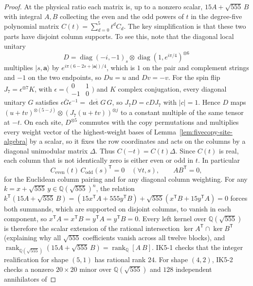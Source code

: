 \begin{proof}
At the physical ratio each matrix is, up to a nonzero scalar,
$15A+\sqrt{555}\,B$ with integral $A,B$ collecting the even and the odd
powers of $t$ in the degree-five polynomial matrix $C(t)=\sum_{d=0}^5 t^d C_d$.
The key simplification is that these two parts have disjoint column supports. To see this, note that the diagonal local unitary
\[
 D=\operatorname{diag}(-i,-1)_s\otimes\operatorname{diag}(1,e^{i\pi/4})^{\otimes6}
\]
multiplies $|s,\mathbf a\rangle$ by $e^{i\pi(6-2s+|\mathbf a|)/4}$, which is $1$ on the
pair and complement strings and $-1$ on the two endpoints, so $Du=u$ and $Dv=-v$.
For the spin flip $J_7=\epsilon^{\otimes7}K$, with
$\epsilon=\bigl(\begin{smallmatrix}0&1\\-1&0\end{smallmatrix}\bigr)$ and $K$ complex
conjugation, every diagonal unitary $G$ satisfies $\epsilon\bar G\epsilon^{-1}=\overline{\det G}\,G$,
so $J_7D=cDJ_7$ with $|c|=1$. Hence $D$ maps
$(u+tv)^{\otimes(5-j)}\otimes(J_7(u+tv))^{\otimes j}$ to a constant multiple of the
same tensor at $-t$. On each site, $D^{\otimes5}$ commutes with the copy permutations
and multiplies every weight vector of the highest-weight bases of
Lemma~\ref{lem:fivecopy-site-algebra} by a scalar, so it fixes the row coordinates
and acts on the columns by a diagonal unimodular matrix $\Delta$. Thus
$C(-t)=C(t)\Delta$. Since $C(t)$ is real, each column that is not identically zero is
either even or odd in $t$. In particular
\[
 C_{\mathrm{even}}(t)\,C_{\mathrm{odd}}(s)^{\mathsf T}=0\quad(\forall t,s),
 \qquad A B^{\mathsf T}=0,
\]
for the Euclidean column pairing and for any diagonal column weighting.
For any $k=x+\sqrt{555}\,y\in\mathbb Q(\sqrt{555})^n$, the relation
$k^{\mathsf T}(15A+\sqrt{555}\,B)=(15x^{\mathsf T}A+555y^{\mathsf T}B)+\sqrt{555}(x^{\mathsf T}B+15y^{\mathsf T}A)=0$
forces both summands, which are supported on disjoint columns, to vanish in each component, so
$x^{\mathsf T}A=x^{\mathsf T}B=y^{\mathsf T}A=y^{\mathsf T}B=0$.
Every left kernel over $\mathbb Q(\sqrt{555})$ is therefore the scalar extension of the rational
intersection $\ker A^{\mathsf T}\cap\ker B^{\mathsf T}$ (explaining why all
$\sqrt{555}$ coefficients vanish across all twelve blocks), and
$\operatorname{rank}_{\mathbb Q(\sqrt{555})}(15A+\sqrt{555}\,B)=\operatorname{rank}_{\mathbb Q}[A\ B]$.
IK5-1 checks that the integer
realification for shape $(5,1)$ has rational rank $24$.  For shape $(4,2)$, IK5-2 checks a nonzero $20\times20$
minor over $\mathbb Q(\sqrt{555})$ and $128$ independent annihilators of

\end{proof}
